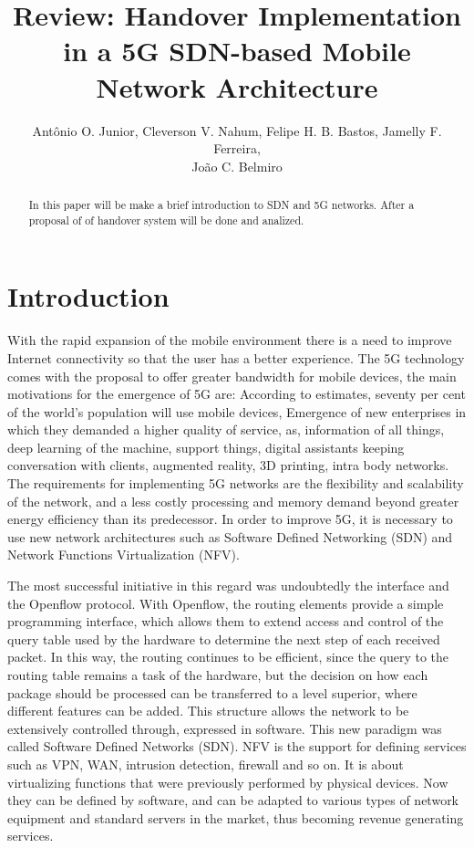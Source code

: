 \documentclass[12pt]{article}
\title{Review: Handover Implementation in a 5G SDN-based Mobile Network Architecture}
\author{Antônio O. Junior\inst{1}, Cleverson V. Nahum\inst{1}, Felipe H. B. Bastos\inst{1}, Jamelly F. Ferreira\inst{1}, \\João C. Belmiro\inst{1} }
\begin{document}
 

\maketitle

\begin{abstract}
  
  In this paper will be make a brief introduction to SDN and 5G networks. After a proposal of of handover system will be done and analized.
  
  
\end{abstract}
     

\section{Introduction}
With the rapid expansion of the mobile environment there is a need to improve Internet connectivity so that the user has a better experience. The 5G technology comes with the proposal to offer greater bandwidth for mobile devices, the main motivations for the emergence of 5G are: According to estimates, seventy per cent of the world's population will use mobile devices, Emergence of new enterprises in which they demanded a higher quality of service, as, information of all things, deep learning of the machine, support things, digital assistants keeping conversation with clients, augmented reality, 3D printing, intra body networks. The requirements for implementing 5G networks are the flexibility and scalability of the network, and a less costly processing and memory demand beyond greater energy efficiency than its predecessor. In order to improve 5G, it is necessary to use new network architectures such as Software Defined Networking (SDN) and Network Functions Virtualization (NFV).

The most successful initiative in this regard was undoubtedly the interface and the Openflow protocol. With Openflow, the routing elements provide a simple programming interface, which allows them to extend access and control of the query table used by the hardware to determine the next step of each received packet. In this way, the routing continues to be efficient, since the query to the routing table remains a task of the hardware, but the decision on how each package should be processed can be transferred to a level superior, where different features can be added. This structure allows the network to be extensively controlled through, expressed in software. This new paradigm was called Software Defined Networks (SDN). NFV is the support for defining services such as VPN, WAN, intrusion detection, firewall and so on. It is about virtualizing functions that were previously performed by physical devices. Now they can be defined by software, and can be adapted to various types of network equipment and standard servers in the market, thus becoming revenue generating services.
\end{document}
